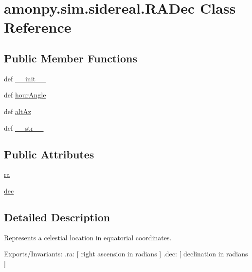 \hypertarget{classamonpy_1_1sim_1_1sidereal_1_1_r_a_dec}{\section{amonpy.\-sim.\-sidereal.\-R\-A\-Dec Class Reference}
\label{classamonpy_1_1sim_1_1sidereal_1_1_r_a_dec}
}
\subsection*{Public Member Functions}
\begin{DoxyCompactItemize}
\item 
def \hyperlink{classamonpy_1_1sim_1_1sidereal_1_1_r_a_dec_a7fcc52d232c37e4100801dac5937bf07}{\-\_\-\-\_\-init\-\_\-\-\_\-}
\item 
def \hyperlink{classamonpy_1_1sim_1_1sidereal_1_1_r_a_dec_a0c665408ad8904cad5a4a4fe2fcb59c6}{hour\-Angle}
\item 
def \hyperlink{classamonpy_1_1sim_1_1sidereal_1_1_r_a_dec_aa6fd908114d65acf9cc93d00ff265ef7}{alt\-Az}
\item 
def \hyperlink{classamonpy_1_1sim_1_1sidereal_1_1_r_a_dec_a34138720c66b6790006018fb43cd0f5f}{\-\_\-\-\_\-str\-\_\-\-\_\-}
\end{DoxyCompactItemize}
\subsection*{Public Attributes}
\begin{DoxyCompactItemize}
\item 
\hyperlink{classamonpy_1_1sim_1_1sidereal_1_1_r_a_dec_aa2e5e1ae8fb268048785320c22e6aef3}{ra}
\item 
\hyperlink{classamonpy_1_1sim_1_1sidereal_1_1_r_a_dec_a02fc3786821a861ab339dd1d6f04d9bd}{dec}
\end{DoxyCompactItemize}


\subsection{Detailed Description}
\begin{DoxyVerb}Represents a celestial location in equatorial coordinates.

  Exports/Invariants:
    .ra:      [ right ascension in radians ]
    .dec:     [ declination in radians ]
\end{DoxyVerb}
 

